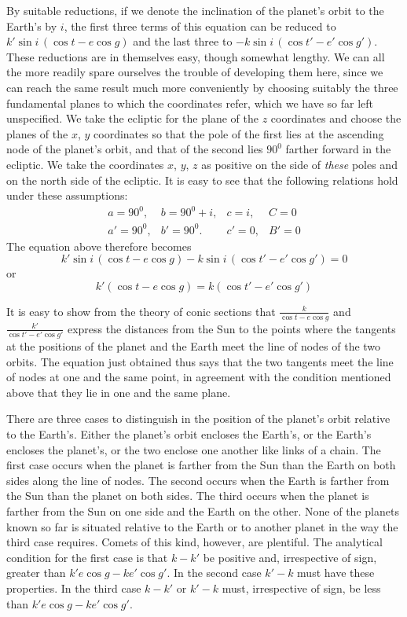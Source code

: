 By suitable reductions, if we denote the inclination of the planet’s
orbit to the Earth’s by $i$, the first three terms of this equation
can be reduced to $k'\sin i\,(\cos t-e\cos g)$ and the last three to
$-k\sin i\,(\cos t'-e'\cos g')$.
%
These reductions are in themselves easy, though somewhat lengthy. We
can all the more readily spare ourselves the trouble of developing
them here, since we can reach the same result much more conveniently
by choosing suitably the three fundamental planes to which the
coordinates refer, which we have so far left unspecified. We take
the ecliptic for the plane of the $z$ coordinates and choose the
planes of the $x$, $y$ coordinates so that the pole of the first
lies at the ascending node of the planet’s orbit, and that of the
second lies $90^0$ farther forward in the ecliptic. We take the
coordinates $x$, $y$, $z$ as positive on the side of \textit{these}
poles and on the north side of the ecliptic. It is easy to see that
the following relations hold under these assumptions:
\[
\begin{array}{llll}
a=90^0,&b=90^0+i,&c=i,&C=0\\
a'=90^0,&b'=90^0.&c'=0,&B'=0
\end{array}
\]
The equation above therefore becomes
\[
k'\sin i\,(\cos t-e\cos g)-k\sin i\,(\cos t'-e'\cos g')=0
\]
or
\[
k'(\cos t-e\cos g)=k(\cos t'-e'\cos g')
\]

It is easy to show from the theory of conic sections that
$\frac{k}{\cos t-e\cos g}$ and $\frac{k'}{\cos t'-e'\cos g'}$ express the
distances from the Sun to the points where the tangents at the
positions of the planet and the Earth meet the line of nodes of
the two orbits. The equation just obtained thus says that the two
tangents meet the line of nodes at one and the same point, in
agreement with the condition mentioned above that they lie in one
and the same plane.

There are three cases to distinguish in the position of the planet’s
orbit relative to the Earth’s. Either the planet’s orbit encloses the
Earth’s, or the Earth’s encloses the planet’s, or the two enclose one
another like links of a chain. The first case occurs when the planet
is farther from the Sun than the Earth on both sides along the line
of nodes. The second occurs when the Earth is farther from the Sun
than the planet on both sides. The third occurs when the planet is
farther from the Sun on one side and the Earth on the other. None of
the planets known so far is situated relative to the Earth or to
another planet in the way the third case requires.
%
Comets of this kind, however, are plentiful. The analytical condition
for the first case is that $k-k'$ be positive and, irrespective of
sign, greater than $k'e\cos g-ke'\cos g'$. In the second case $k'-k$
must have these properties. In the third case $k-k'$ or $k'-k$ must,
irrespective of sign, be less than $k'e\cos g-ke'\cos g'$.

